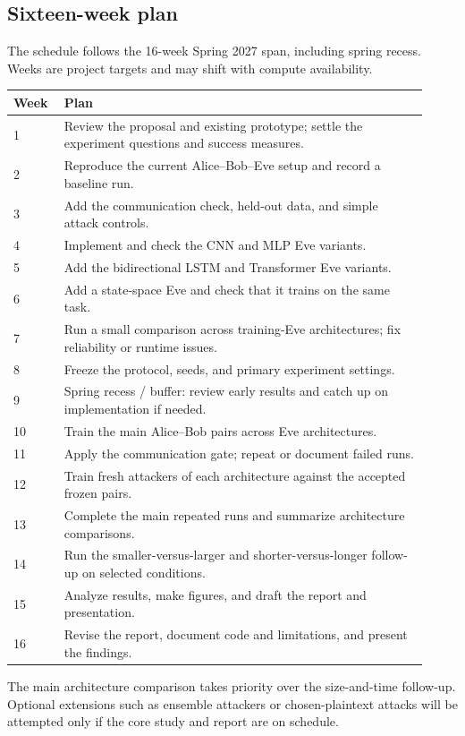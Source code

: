 \documentclass[10pt,letterpaper]{article}
\begin{document}
\subsection{Sixteen-week plan}
The schedule follows the 16-week Spring 2027 span, including spring recess. Weeks are project targets and may shift with compute availability.
\begin{center}
\small
\begin{tabular}{@{}p{0.11\linewidth}p{0.81\linewidth}@{}}
\toprule
\textbf{Week} & \textbf{Plan} \\
\midrule
1 & Review the proposal and existing prototype; settle the experiment questions and success measures. \\
2 & Reproduce the current Alice--Bob--Eve setup and record a baseline run. \\
3 & Add the communication check, held-out data, and simple attack controls. \\
4 & Implement and check the CNN and MLP Eve variants. \\
5 & Add the bidirectional LSTM and Transformer Eve variants. \\
6 & Add a state-space Eve and check that it trains on the same task. \\
7 & Run a small comparison across training-Eve architectures; fix reliability or runtime issues. \\
8 & Freeze the protocol, seeds, and primary experiment settings. \\
9 & Spring recess / buffer: review early results and catch up on implementation if needed. \\
10 & Train the main Alice--Bob pairs across Eve architectures. \\
11 & Apply the communication gate; repeat or document failed runs. \\
12 & Train fresh attackers of each architecture against the accepted frozen pairs. \\
13 & Complete the main repeated runs and summarize architecture comparisons. \\
14 & Run the smaller-versus-larger and shorter-versus-longer follow-up on selected conditions. \\
15 & Analyze results, make figures, and draft the report and presentation. \\
16 & Revise the report, document code and limitations, and present the findings. \\
\bottomrule
\end{tabular}
\end{center}
The main architecture comparison takes priority over the size-and-time follow-up. Optional extensions such as ensemble attackers or chosen-plaintext attacks will be attempted only if the core study and report are on schedule.
\end{document}
